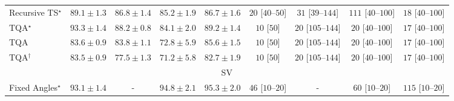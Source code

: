 \begin{tabular}{l|cccc|cccc|}
Recursive TS$^\star$ & {\cellcolor[HTML]{066D39}} \color[HTML]{F1F1F1} $89.1\pm 1.3$ & {\cellcolor[HTML]{15793E}} \color[HTML]{F1F1F1} $86.8\pm 1.4$ & {\cellcolor[HTML]{1F8142}} \color[HTML]{F1F1F1} $85.2\pm 1.9$ & {\cellcolor[HTML]{15793E}} \color[HTML]{F1F1F1} $86.7\pm 1.6$ & {\cellcolor[HTML]{FFF3F0}} \color[HTML]{000000} $20$ [$40$--$50$] & {\cellcolor[HTML]{FEF1ED}} \color[HTML]{000000} $31$ [$39$--$144$] & {\cellcolor[HTML]{FDDDDA}} \color[HTML]{000000} $111$ [$40$--$100$] & {\cellcolor[HTML]{FFF3F0}} \color[HTML]{000000} $18$ [$40$--$100$] \\
TQA$^\star$ & {\cellcolor[HTML]{00522E}} \color[HTML]{F1F1F1} $93.3\pm 1.4$ & {\cellcolor[HTML]{0B713B}} \color[HTML]{F1F1F1} $88.2\pm 0.8$ & {\cellcolor[HTML]{268846}} \color[HTML]{F1F1F1} $84.1\pm 2.0$ & {\cellcolor[HTML]{056C39}} \color[HTML]{F1F1F1} $89.2\pm 1.4$ & {\cellcolor[HTML]{FFF6F2}} \color[HTML]{000000} $10$ [$50$] & {\cellcolor[HTML]{FFF3F0}} \color[HTML]{000000} $20$ [$105$--$144$] & {\cellcolor[HTML]{FFF3F0}} \color[HTML]{000000} $20$ [$40$--$100$] & {\cellcolor[HTML]{FFF4F0}} \color[HTML]{000000} $17$ [$40$--$100$] \\
TQA & {\cellcolor[HTML]{298C48}} \color[HTML]{F1F1F1} $83.6\pm 0.9$ & {\cellcolor[HTML]{288A47}} \color[HTML]{F1F1F1} $83.8\pm 1.1$ & {\cellcolor[HTML]{84CB7E}} \color[HTML]{000000} $72.8\pm 5.9$ & {\cellcolor[HTML]{1D7F41}} \color[HTML]{F1F1F1} $85.6\pm 1.5$ & {\cellcolor[HTML]{FFF6F2}} \color[HTML]{000000} $10$ [$50$] & {\cellcolor[HTML]{FFF3F0}} \color[HTML]{000000} $20$ [$105$--$144$] & {\cellcolor[HTML]{FFF3F0}} \color[HTML]{000000} $20$ [$40$--$100$] & {\cellcolor[HTML]{FFF4F0}} \color[HTML]{000000} $17$ [$40$--$100$] \\
TQA$^\dagger$ & {\cellcolor[HTML]{298C48}} \color[HTML]{F1F1F1} $83.5\pm 0.9$ & {\cellcolor[HTML]{53B466}} \color[HTML]{F1F1F1} $77.5\pm 1.3$ & {\cellcolor[HTML]{93D284}} \color[HTML]{000000} $71.2\pm 5.8$ & {\cellcolor[HTML]{2E924C}} \color[HTML]{F1F1F1} $82.7\pm 1.9$ & {\cellcolor[HTML]{FFF6F2}} \color[HTML]{000000} $10$ [$50$] & {\cellcolor[HTML]{FFF3F0}} \color[HTML]{000000} $20$ [$105$--$144$] & {\cellcolor[HTML]{FFF3F0}} \color[HTML]{000000} $20$ [$40$--$100$] & {\cellcolor[HTML]{FFF4F0}} \color[HTML]{000000} $17$ [$40$--$100$] \\
\cline{1-9}
\multicolumn{9}{c}{\rule{0pt}{8pt}SV} \\
\midrule
Fixed Angles$^\star$ & {\cellcolor[HTML]{03466E}} \color[HTML]{F1F1F1} $93.1\pm 1.4$ & {\cellcolor[HTML]{000000}} \color[HTML]{F1F1F1} {\cellcolor{white}} \color{black} - & {\cellcolor[HTML]{023B5D}} \color[HTML]{F1F1F1} $94.8\pm 2.1$ & {\cellcolor[HTML]{023858}} \color[HTML]{F1F1F1} $95.3\pm 2.0$ & {\cellcolor[HTML]{FEEDE9}} \color[HTML]{000000} $46$ [$10$--$20$] & {\cellcolor[HTML]{000000}} \color[HTML]{F1F1F1} {\cellcolor{white}} \color{black} - & {\cellcolor[HTML]{FEEAE7}} \color[HTML]{000000} $60$ [$10$--$20$] & {\cellcolor[HTML]{FDDDD9}} \color[HTML]{000000} $115$ [$10$--$20$] \\

\end{tabular}
